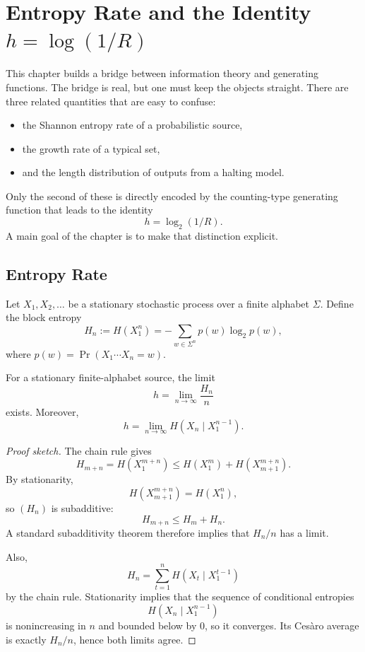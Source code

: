 \chapter{Entropy Rate and the Identity $h = \log(1/R)$}
\label{ch09:top}

This chapter builds a bridge between information theory and generating functions. The bridge is real, but one must keep the objects straight. There are three related quantities that are easy to confuse:
\begin{itemize}
  \item the Shannon entropy rate of a probabilistic source,
  \item the growth rate of a typical set,
  \item and the length distribution of outputs from a halting model.
\end{itemize}
Only the second of these is directly encoded by the counting-type generating function that leads to the identity
\begin{equation}
  \label{eq:h-log-R}
  h = \log_2(1/R).
\end{equation}
A main goal of the chapter is to make that distinction explicit.

\section{Entropy Rate}

Let $X_1,X_2,\dots$ be a stationary stochastic process over a finite alphabet $\Sigma$. Define the block entropy
\[
  H_n := H(X_1^n) = -\sum_{w \in \Sigma^n} p(w) \log_2 p(w),
\]
where $p(w)=\Pr(X_1\cdots X_n = w)$.

\begin{proposition}
For a stationary finite-alphabet source, the limit
\[
  h = \lim_{n \to \infty} \frac{H_n}{n}
\]
exists. Moreover,
\[
  h = \lim_{n \to \infty} H(X_n \mid X_1^{n-1}).
\]
\end{proposition}

\begin{proof}[Proof sketch]
The chain rule gives
\[
  H_{m+n} = H(X_1^{m+n}) \le H(X_1^m) + H(X_{m+1}^{m+n}).
\]
By stationarity,
\[
  H(X_{m+1}^{m+n}) = H(X_1^n),
\]
so $(H_n)$ is subadditive:
\[
  H_{m+n} \le H_m + H_n.
\]
A standard subadditivity theorem therefore implies that $H_n/n$ has a limit.

Also,
\[
  H_n = \sum_{t=1}^n H(X_t \mid X_1^{t-1})
\]
by the chain rule. Stationarity implies that the sequence of conditional entropies
\[
  H(X_n \mid X_1^{n-1})
\]
is nonincreasing in $n$ and bounded below by $0$, so it converges. Its Ces\`aro average is exactly $H_n/n$, hence both limits agree.
\end{proof}

